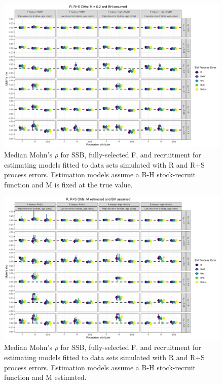 \documentclass[
  12pt,
]{article}
\begin{document}
\begin{landscape}
\begin{figure}
\caption{Median Mohn's $\rho$ for SSB, fully-selected F, and recruitment for estimating models fitted to data sets simulated with R and R+S process errors.  Estimation models assume a B-H stock-recruit function and M is fixed at the true value.}\label{naa_om_em_BH_MF_mohns_rho}
\begin{center}
\includegraphics[width = \textwidth]{naa_om_mohns_rho_BH_MF.png}
\end{center}
\end{figure}
\end{landscape}

\begin{landscape}
\begin{figure}
\caption{Median Mohn's $\rho$ for SSB, fully-selected F, and recruitment for estimating models fitted to data sets simulated with R and R+S process errors.  Estimation models assume a B-H stock-recruit function and M estimated.}\label{naa_om_em_BH_ME_mohns_rho}
\begin{center}
\includegraphics[width = \textwidth]{naa_om_mohns_rho_BH_ME.png}
\end{center}
\end{figure}
\end{landscape}
\end{document}
